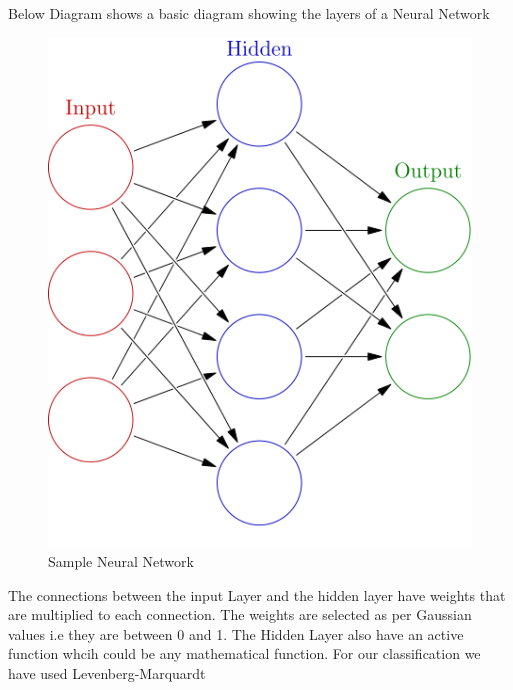 \documentclass[12pt]{article}
\begin{document}
Below Diagram shows a basic diagram showing the layers of a Neural Network
\begin{figure}[H]
\center
\includegraphics [scale=0.5]{ann.png}
\caption{Sample Neural Network}
\end{figure}
The connections between the input Layer and the hidden layer have weights that are multiplied to each connection. The weights are selected as per Gaussian values i.e they are between 0 and 1.
The Hidden Layer also have an active function whcih could be any mathematical function. For our classification we have used Levenberg-Marquardt
\end{document}
